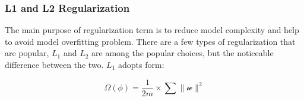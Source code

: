 \subsubsection{L1 and L2 Regularization}

The main purpose of regularization term is to reduce model complexity and help to avoid model overfitting problem. There are a few types of regularization that are popular, $L_1$ and $L_2$ are among the popular choices, but the noticeable difference between the two. $L_1$ adopts form:

\begin{equation}
   \Omega(\phi) = \frac {1}{2m} \times \sum \parallel \mathcal{w} \parallel^2
\end{equation}